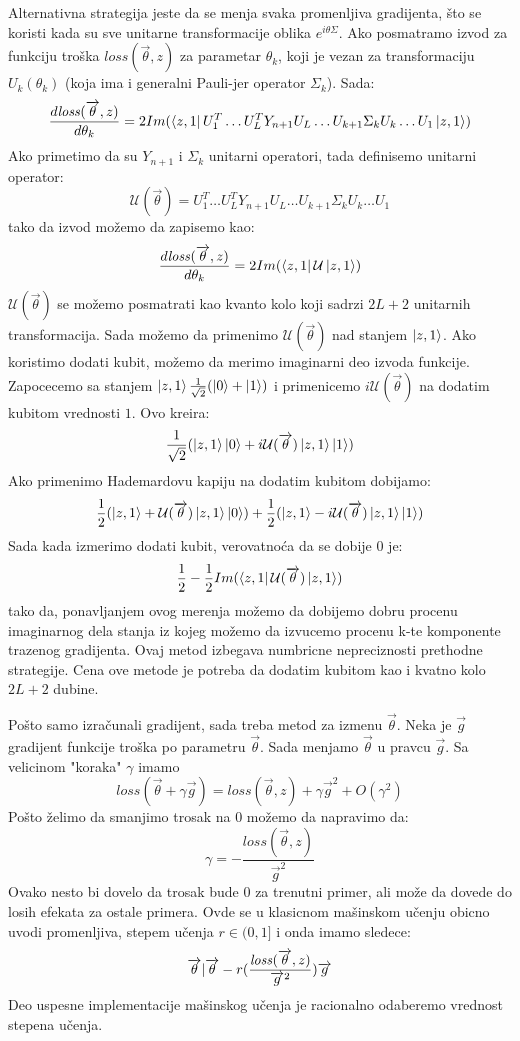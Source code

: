 \documentclass[12pt, letterpaper, oneside]{article}
\begin{document}
Alternativna strategija jeste da se menja svaka promenljiva gradijenta, što se koristi kada su sve unitarne transformacije oblika $e^{i\theta\Sigma}$.
Ako posmatramo izvod za funkciju troška $\mathit{loss}(\overrightarrow{\theta},z)$ za parametar $\theta_k$, koji je vezan za transformaciju $U_k(\theta_k)$
(koja ima i generalni Pauli-jer operator $\Sigma_k$). Sada:
\[
    \frac{d\mathit{loss}(\overrightarrow{\theta},z)}{d\theta_k} = 2Im(\Bra{z,1}U_1^T \dots U_L^TY_{n+1}U_L \dots U_{k+1} \Sigma_k U_k \dots U_1 \Ket{z,1})
\]
Ako primetimo da su $Y_{n+1}$ i $\Sigma_k$ unitarni operatori, tada definisemo unitarni operator:
\[
    \mathcal{U}(\overrightarrow{\theta}) = U_1^T \dots U_L^TY_{n+1}U_L \dots U_{k+1} \Sigma_k U_k \dots U_1
\]
tako da izvod možemo da zapisemo kao:
\[
    \frac{d\mathit{loss}(\overrightarrow{\theta},z)}{d\theta_k} = 2Im(\Bra{z,1}\mathcal{U}\Ket{z,1})
\]
$\mathcal{U}(\overrightarrow{\theta})$ se možemo posmatrati kao kvanto kolo koji sadrzi $2L+2$ unitarnih transformacija.
Sada možemo da primenimo $\mathcal{U}(\overrightarrow{\theta})$ nad stanjem $\Ket{z,1}$. Ako koristimo dodati kubit, možemo da merimo imaginarni deo
izvoda funkcije. Zapocecemo sa stanjem $\Ket{z,1}\frac{1}{\sqrt{2}}(\Ket{0}+\Ket{1})$ i primenicemo $i\mathcal{U}(\overrightarrow{\theta})$ na dodatim kubitom vrednosti $1$.
Ovo kreira:
\[
    \frac{1}{\sqrt{2}}(\Ket{z,1}\Ket{0} + i\mathcal{U}(\overrightarrow{\theta})\Ket{z,1}\Ket{1})
\]
Ako primenimo Hademardovu kapiju na dodatim kubitom dobijamo:
\[
    \frac{1}{2}(\Ket{z,1}+\mathcal{U}(\overrightarrow{\theta})\Ket{z,1}\Ket{0}) + \frac{1}{2}(\Ket{z,1}-i\mathcal{U}(\overrightarrow{\theta})\Ket{z,1}\Ket{1})
\]
Sada kada izmerimo dodati kubit, verovatnoća da se dobije $0$ je:
\[
    \frac{1}{2} - \frac{1}{2}Im(\bra{z,1}\mathcal{U}(\overrightarrow{\theta})\Ket{z,1})
\]
tako da, ponavljanjem ovog merenja možemo da dobijemo dobru procenu imaginarnog dela stanja iz kojeg možemo da izvucemo procenu k-te komponente trazenog gradijenta.
Ovaj metod izbegava numbricne nepreciznosti prethodne strategije. Cena ove metode je potreba da dodatim kubitom kao i kvatno kolo $2L+2$ dubine.

Pošto samo izračunali gradijent, sada treba metod za izmenu $\overrightarrow{\theta}$. Neka je $\overrightarrow{g}$ gradijent funkcije troška po parametru $\overrightarrow{\theta}$.
Sada menjamo $\overrightarrow{\theta}$ u pravcu $\overrightarrow{g}$. Sa velicinom "koraka" $\gamma$ imamo
\[
    \mathit{loss}(\overrightarrow{\theta}+\gamma \overrightarrow{g}) = \mathit{loss}(\overrightarrow{\theta},z)+ \gamma \overrightarrow{g}^2 + O(\gamma^2)
\]
Pošto želimo da smanjimo trosak na $0$ možemo da napravimo da:
\[
    \gamma = -\frac{\mathit{loss}(\overrightarrow{\theta},z)}{\overrightarrow{g}^2}
\]
Ovako nesto bi dovelo da trosak bude $0$ za trenutni primer, ali može da dovede do losih efekata za ostale primera. 
Ovde se u klasicnom mašinskom učenju obicno uvodi promenljiva, stepem učenja $r \in (0,1]$ i onda imamo sledece:
\[
    \overrightarrow{\theta} \arrowvert \overrightarrow{\theta} - r(\frac{\mathit{loss}(\overrightarrow{\theta},z)}{\overrightarrow{g}^2})\overrightarrow{g}
\]
Deo uspesne implementacije mašinskog učenja je racionalno odaberemo vrednost stepena učenja.
\end{document}

